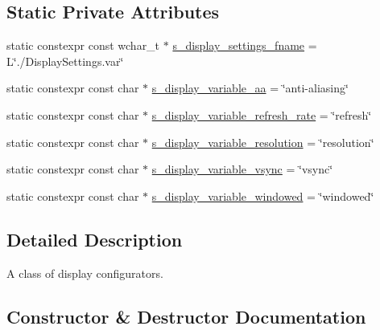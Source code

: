 \subsection*{Static Private Attributes}
\begin{DoxyCompactItemize}
\item 
static constexpr const wchar\+\_\+t $\ast$ \hyperlink{classmage_1_1rendering_1_1_display_configurator_1_1_impl_ad0276623b8642595132fb873d06bfd61}{s\+\_\+display\+\_\+settings\+\_\+fname} = L\char`\"{}./Display\+Settings.\+var\char`\"{}
\item 
static constexpr const char $\ast$ \hyperlink{classmage_1_1rendering_1_1_display_configurator_1_1_impl_aaff98797b745244f86a75458f49bc806}{s\+\_\+display\+\_\+variable\+\_\+aa} = \char`\"{}anti-\/aliasing\char`\"{}
\item 
static constexpr const char $\ast$ \hyperlink{classmage_1_1rendering_1_1_display_configurator_1_1_impl_abda6f50d13c1e4118ba0f022818b15c9}{s\+\_\+display\+\_\+variable\+\_\+refresh\+\_\+rate} = \char`\"{}refresh\char`\"{}
\item 
static constexpr const char $\ast$ \hyperlink{classmage_1_1rendering_1_1_display_configurator_1_1_impl_ace178b1cd3a4d9ac1c91dada266b99db}{s\+\_\+display\+\_\+variable\+\_\+resolution} = \char`\"{}resolution\char`\"{}
\item 
static constexpr const char $\ast$ \hyperlink{classmage_1_1rendering_1_1_display_configurator_1_1_impl_ad2dad3e241786f123edf66910545d63b}{s\+\_\+display\+\_\+variable\+\_\+vsync} = \char`\"{}vsync\char`\"{}
\item 
static constexpr const char $\ast$ \hyperlink{classmage_1_1rendering_1_1_display_configurator_1_1_impl_a61cf721feb5eb15a4ef27a14da4b74f8}{s\+\_\+display\+\_\+variable\+\_\+windowed} = \char`\"{}windowed\char`\"{}
\end{DoxyCompactItemize}


\subsection{Detailed Description}
A class of display configurators. 

\subsection{Constructor \& Destructor Documentation}
\hypertarget{classmage_1_1rendering_1_1_display_configurator_1_1_impl_a0aa85d25b294d8ecec7fc83d4a6d80e2}{}\label{classmage_1_1rendering_1_1_display_configurator_1_1_impl_a0aa85d25b294d8ecec7fc83d4a6d80e2} 
